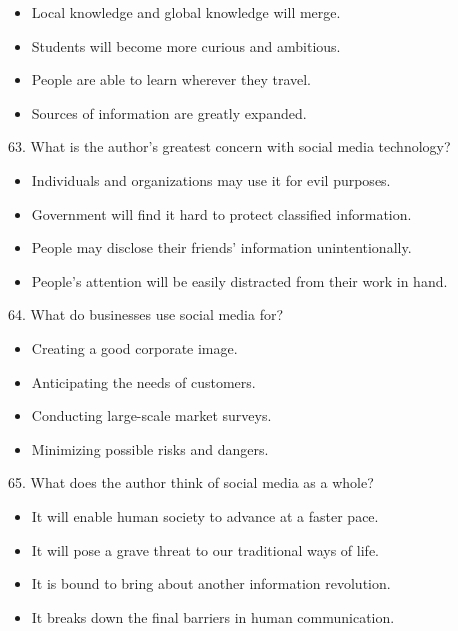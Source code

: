 \documentclass[UTF8,11pt]{ctexart}
\begin{document}
\begin{itemize}[leftmargin=2em,itemsep=.2em,topsep=.4em]\item[A.] Local knowledge and global knowledge will merge.
\item[B.] Students will become more curious and ambitious.
\item[C.] People are able to learn wherever they travel.
\item[D.] Sources of information are greatly expanded.
\end{itemize}

63. What is the author’s greatest concern with social media technology?


\begin{itemize}[leftmargin=2em,itemsep=.2em,topsep=.4em]\item[A.] Individuals and organizations may use it for evil purposes.
\item[B.] Government will find it hard to protect classified information.
\item[C.] People may disclose their friends’ information unintentionally.
\item[D.] People’s attention will be easily distracted from their work in hand.
\end{itemize}

64. What do businesses use social media for?


\begin{itemize}[leftmargin=2em,itemsep=.2em,topsep=.4em]\item[A.] Creating a good corporate image.
\item[B.] Anticipating the needs of customers.
\item[C.] Conducting large-scale market surveys.
\item[D.] Minimizing possible risks and dangers.
\end{itemize}

65. What does the author think of social media as a whole?


\begin{itemize}[leftmargin=2em,itemsep=.2em,topsep=.4em]\item[A.] It will enable human society to advance at a faster pace.
\item[B.] It will pose a grave threat to our traditional ways of life.
\item[C.] It is bound to bring about another information revolution.
\item[D.] It breaks down the final barriers in human communication.
\end{itemize}
\end{document}
